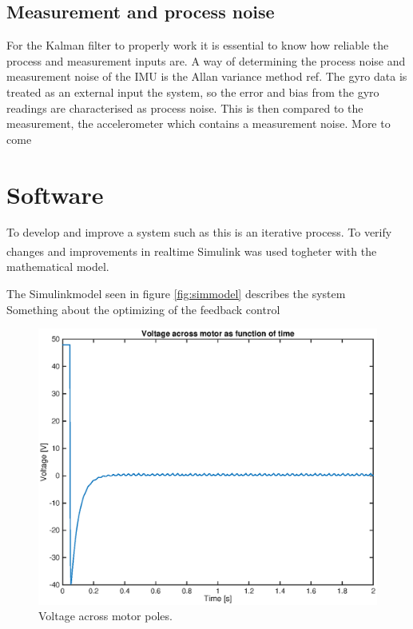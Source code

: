 \documentclass[a4paper,11pt]{kth-mag}
\begin{document}
\subsection{Measurement and process noise}
For the Kalman filter to properly work it is essential to know how reliable the process and measurement inputs are. A way of determining the process noise and measurement noise of the IMU is the Allan variance method ref.
The gyro data is treated as an external input the system, so the error and bias from the gyro readings are characterised as process noise. This is then compared to the measurement, the accelerometer which contains a measurement noise.
More to come

\section{Software}
To develop and improve a system such as this is an iterative process. To verify changes and improvements in realtime Simulink\textsuperscript{\textregistered} was used togheter with the mathematical model. 



The Simulinkmodel seen in figure \ref{fig:simmodel} describes the system
\\ Something about the  optimizing of the feedback control
\begin{figure}[!htb]
\centering
\includegraphics[scale=.7]{voltageplot.eps}
\caption{Voltage across motor poles.}
\label{fig:voltageplot}
\end{figure}
\end{document}

